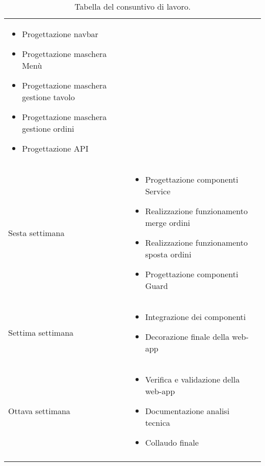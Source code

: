 \begin{center}
\begin{longtable}{ |p{3cm}|p{9cm}|  }
\begin{itemize}
            \item Progettazione navbar
            \item Progettazione maschera Menù
            \item Progettazione maschera gestione tavolo
            \item Progettazione maschera gestione ordini
            \item Progettazione API
        \end{itemize}\\
        Sesta settimana&\begin{itemize}
            \item Progettazione componenti Service
            \item Realizzazione funzionamento merge ordini
            \item Realizzazione funzionamento sposta ordini
            \item Progettazione componenti Guard
        \end{itemize}\\
        Settima settimana&\begin{itemize}
            \item Integrazione dei componenti
            \item Decorazione finale della web-app
        \end{itemize}\\
        Ottava settimana&\begin{itemize}
            \item Verifica e validazione della web-app
            \item Documentazione analisi tecnica
            \item Collaudo finale
        \end{itemize}\\
\hline
\caption{\label{tab:tabella consuntivo lavoro}Tabella del consuntivo di lavoro.}
\end{longtable}
\end{center}



